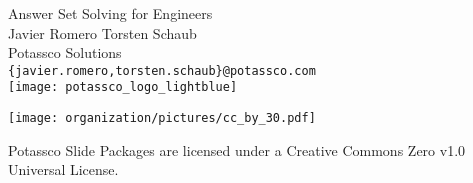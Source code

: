\begin{frame}[c]
  \bigskip
  \vfill
  \begin{center}%
    \alert{\huge Answer Set Solving for Engineers}
    \bigskip
    \bigskip
    \\
    Javier Romero \quad
    Torsten Schaub\\
    Potassco Solutions\\
    \texttt{\{javier.romero,torsten.schaub\}@potassco.com}\\
    \bigskip
    \texttt{[image: potassco\_logo\_lightblue]}
  \end{center}
  \bigskip
  \begin{center}
    \texttt{[image: organization/pictures/cc\_by\_30.pdf]} %
    \par
    {\tiny Potassco Slide Packages are licensed under a Creative Commons Zero v1.0 Universal License.}
  \end{center}
\end{frame}
%
